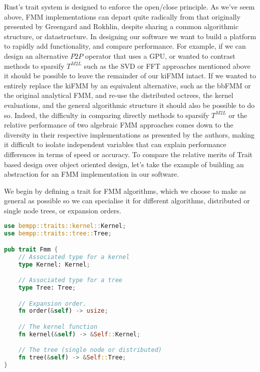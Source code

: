 Rust's trait system is designed to enforce the open/close principle. As we've seem above, FMM implementations can depart quite radically from that originally presented by Greengard and Rokhlin, despite sharing a common algorithmic structure, or datastructure. In designing our software we want to build a platform to rapidly add functionality, and compare performance. For example, if we can design an alternative $P2P$ operator that uses a GPU, or wanted to contrast methods to sparsify $T^{M2L}$ such as the SVD or FFT approaches mentioned above it should be possible to leave the remainder of our kiFMM intact. If we wanted to entirely replace the kiFMM by an equivalent alternative, such as the bbFMM or the original analytical FMM, and re-use the distributed octrees, the kernel evaluations, and the general algorithmic structure it should also be possible to do so. Indeed, the difficulty in comparing directly methods to sparsify $T^{M2L}$ or the relative performance of two algebraic FMM approaches comes down to the diversity in their respective implementations as presented by the authors, making it difficult to isolate independent variables that can explain performance differences in terms of speed or accuracy. To compare the relative merits of Trait based design over object oriented design, let's take the example of building an abstraction for an FMM implementation in our software.

We begin by defining a trait for FMM algorithms, which we choose to make as general as possible so we can specialise it for different algorithms, distributed or single node trees, or expansion orders.

\begin{lstlisting}[language=Rust, caption={Traits for FMM Algorithms.},  label=code:chpt:2:sec:3:fmm]
use bempp::traits::kernel::Kernel;
use bempp::traits::tree::Tree;

pub trait Fmm {
    // Associated type for a kernel
    type Kernel: Kernel;

    // Associated type for a tree
    type Tree: Tree;

    // Expansion order.
    fn order(&self) -> usize;

    // The kernel function
    fn kernel(&self) -> &Self::Kernel;

    // The tree (single node or distributed)
    fn tree(&self) -> &Self::Tree;
}
\end{lstlisting}

